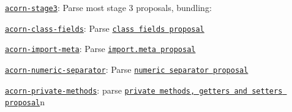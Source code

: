 \begin{DoxyItemize}
\item \href{https://github.com/acornjs/acorn-stage3}{\tt {\ttfamily acorn-\/stage3}}\+: Parse most stage 3 proposals, bundling\+:
\begin{DoxyItemize}
\item \href{https://github.com/acornjs/acorn-class-fields}{\tt {\ttfamily acorn-\/class-\/fields}}\+: Parse \href{https://github.com/tc39/proposal-class-fields}{\tt class fields proposal}
\item \href{https://github.com/acornjs/acorn-import-meta}{\tt {\ttfamily acorn-\/import-\/meta}}\+: Parse \href{https://github.com/tc39/proposal-import-meta}{\tt import.\+meta proposal}
\item \href{https://github.com/acornjs/acorn-numeric-separator}{\tt {\ttfamily acorn-\/numeric-\/separator}}\+: Parse \href{https://github.com/tc39/proposal-numeric-separator}{\tt numeric separator proposal}
\item \href{https://github.com/acornjs/acorn-private-methods}{\tt {\ttfamily acorn-\/private-\/methods}}\+: parse \href{https://github.com/tc39/proposal-private-methods}{\tt private methods, getters and setters proposal}n 
\end{DoxyItemize}
\end{DoxyItemize}